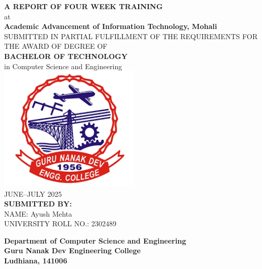 \documentclass[a4paper,12pt,oneside]{report}
\numberwithin{equation}{chapter}
\numberwithin{figure}{chapter}
\numberwithin{table}{chapter}
\begin{document}
\setcounter{page}{1}

\begin{titlepage}
\begin{center}
    \Large\textbf{A REPORT OF FOUR WEEK TRAINING}\\[3mm]
    \large{at}\\[3mm]
    \Large\textbf{Academic Advancement of Information Technology, Mohali}\\[6mm]
    \normalsize{SUBMITTED IN PARTIAL FULFILLMENT OF THE REQUIREMENTS FOR THE AWARD OF DEGREE OF}\\[3mm]
    \Large\textbf{BACHELOR OF TECHNOLOGY}\\[3mm]
    \large{in Computer Science and Engineering}\\[9mm]
    \includegraphics[height=6cm]{gndeclogo.png}\\[6mm]
    \large{JUNE–JULY 2025}\\[9mm]
    \textbf{SUBMITTED BY:}\\
    NAME: Ayush Mehta\\
    UNIVERSITY ROLL NO.: 2302489
\end{center}

\vspace{10mm}
\begin{center}
    \textbf{Department of Computer Science and Engineering}\\
    \textbf{Guru Nanak Dev Engineering College}\\
    \textbf{Ludhiana, 141006}
\end{center}
\end{titlepage}
\end{document}
